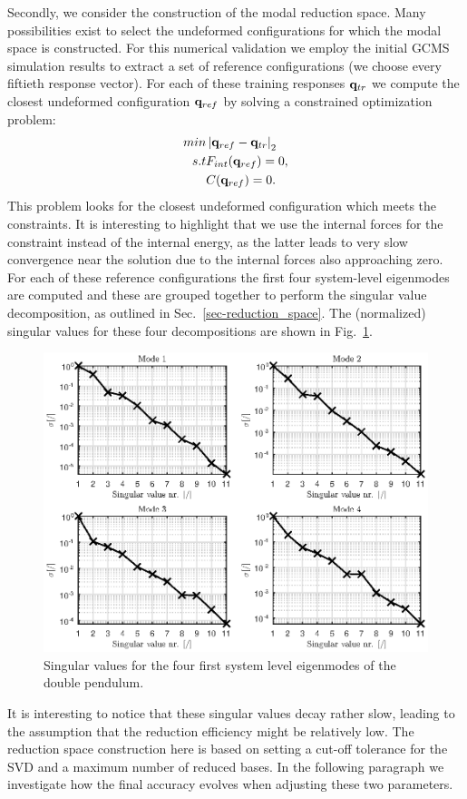 Secondly, we consider the construction of the modal reduction space. Many possibilities exist to select the undeformed configurations for which the modal space is constructed. For this numerical validation we employ the initial GCMS simulation results to extract a set of reference configurations (we choose every fiftieth response vector). For each of these training responses $\mathbf q_{tr}$ we compute the closest undeformed configuration $\mathbf q_{ref}$ by solving a constrained optimization problem:
\begin{eqnarray}
min & \left|\mathbf q_{ref}-\mathbf q_{tr}\right|_2 \\
s.t & F_{int}(\mathbf q_{ref}) = 0, \\
& C(\mathbf q_{ref}) = 0.
\end{eqnarray}
This problem looks for the closest undeformed configuration which meets the constraints. It is interesting to highlight that we use the internal forces for the constraint instead of the internal energy, as the latter leads to very slow convergence near the solution due to the internal forces also approaching zero. 
For each of these reference configurations the first four system-level eigenmodes are computed and these are grouped together to perform the singular value decomposition, as outlined in Sec.~\ref{sec-reduction_space}. The (normalized) singular values for these four decompositions are shown in Fig.~\ref{fig:DoublePendulumModalSigmas}.
\begin{figure}[htp]
\centering
\includegraphics[scale=1]{DoublePendulumModalSigmas.eps} 
\caption{Singular values for the four first system level eigenmodes of the double pendulum.}
\label{fig:DoublePendulumModalSigmas}
\end{figure}
It is interesting to notice that these singular values decay rather slow, leading to the assumption that the reduction efficiency might be relatively low. 
The reduction space construction here is based on setting a cut-off tolerance for the SVD and a maximum number of reduced bases. In the following paragraph we investigate how the final accuracy evolves when adjusting these two parameters. 

